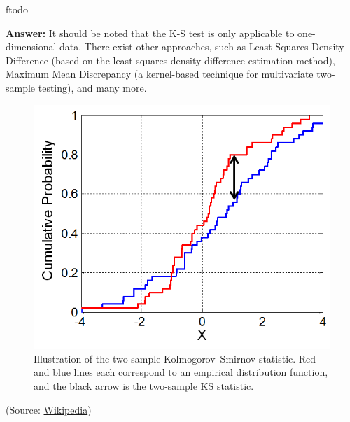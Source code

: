 ƒtodo\documentclass{article}
\newenvironment{QandA}{\begin{enumerate}[label=\arabic*.]}{\end{enumerate}}
\newenvironment{answer}{\par\normalfont \textbf{Answer:}}{}
\begin{document}
\begin{QandA}
\begin{answer}
        It should be noted that the K-S test is only applicable to one-dimensional data. There exist other approaches, such as Least-Squares Density Difference (based on the least squares density-difference estimation method), Maximum Mean Discrepancy (a kernel-based technique for multivariate two-sample testing), and many more.
        
        \begin{figure}[htb!]
            \centering
            \includegraphics[width=0.4\columnwidth]{img/ks.png}
            \caption{Illustration of the two-sample Kolmogorov–Smirnov statistic. Red and blue lines each correspond to an empirical distribution function, and the black arrow is the two-sample KS statistic.}
            \label{fig:ks}
        \end{figure}
        (Source: \href{https://en.wikipedia.org/wiki/Kolmogorov%E2%80%93Smirnov_test}{Wikipedia})
    \end{answer}


\end{QandA}
\end{document}

